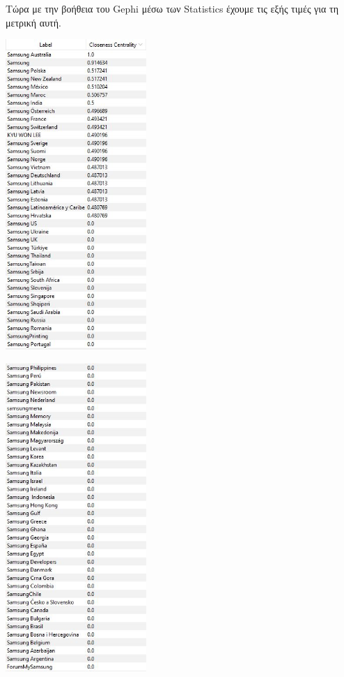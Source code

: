 \documentclass[12pt]{article}
\begin{document}
	\newpage
	Τώρα με την βοήθεια του Gephi μέσω των Statistics έχουμε τις εξής τιμές για τη μετρική αυτή.
	\vspace{12pt}
	\begin{center}
		\begin{adjustbox}{valign=t}
			\includegraphics[width=0.4\textwidth]{photos-files/section7/closeness_centrality1.JPG}
		\end{adjustbox}
		\hfill
		\begin{adjustbox}{valign=t}
			\includegraphics[width=0.4\textwidth]{photos-files/section7/closeness_centrality2.JPG}
		\end{adjustbox}
	\end{center}
	
\end{document}
